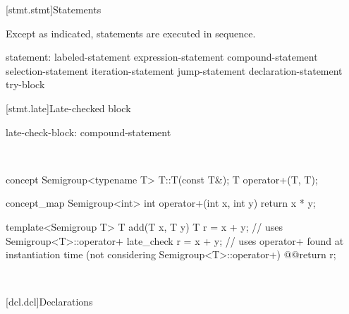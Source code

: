 \documentclass[american]{book}
\begin{document}
[stmt.stmt]{Statements}

\begin{paras}

\pnum
{}%
\textcolor{black}{}Except as indicated, statements are executed in sequence.
%

\begin{bnf}
%
statement:\br
    labeled-statement\br
    expression-statement\br
    compound-statement\br
    selection-statement\br
    iteration-statement\br
    jump-statement\br
    declaration-statement\br
    try-block\br
\end{bnf}

\color{addclr}
\setcounter{section}{8}
[stmt.late]{Late-checked block}

\pnum
{} 
  
\begin{bnf}
late-check-block:\br
     compound-statement
\end{bnf}

\pnum
\enterexample\
\begin{codeblock}
concept Semigroup<typename T> {
  T::T(const T&);
  T operator+(T, T);
}

concept_map Semigroup<int> {
  int operator+(int x, int y) { return x * y; }
}

template<Semigroup T> 
T add(T x, T y) { 
  T r = x + y; // uses Semigroup<T>::operator+
  late_check {
    r = x + y; // uses operator+ found at instantiation time (not considering Semigroup<T>::operator+)
  }
  @\textcolor{addclr}{}@return r;
}
\end{codeblock}
\exitexample\
\color{black}

\end{paras}

[dcl.dcl]{Declarations}
\end{document}
